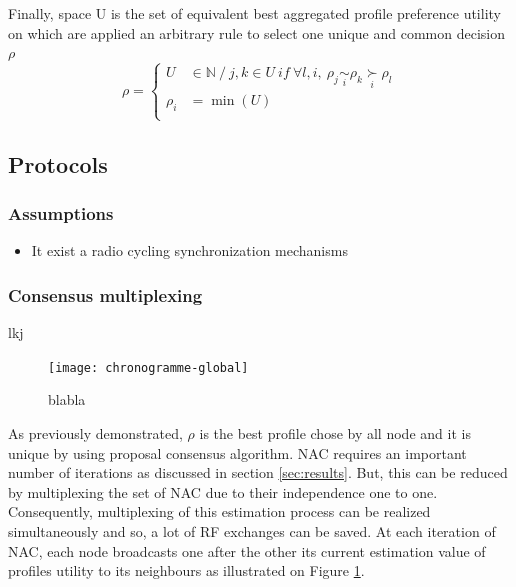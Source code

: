 \documentclass[conference]{IEEEtran}
\newcommand{\preferal}[1]{\underset{#1}{\succ}}
\newcommand{\equivalent}[1]{\underset{#1}{\sim}}
\begin{document}
Finally, space U is the set of equivalent best aggregated profile preference utility on which are applied an arbitrary rule to select one unique and common decision $\rho$
\begin{equation}
\label{eq-decision}
\rho = \left\{
      \begin{aligned}
      U &\in \mathbb{N} \ / \ j,k \in U \ if \ \forall l,i, \ \rho_j \equivalent{i} \rho_k \preferal{i} \rho_l \\
     \rho_i &= \min(U)\\
      \end{aligned}
    \right.
\end{equation}

\subsection{Protocols}

\subsubsection{Assumptions}


\begin{itemize}
   \item It exist a radio cycling synchronization mechanisms
\end{itemize}

\subsubsection{Consensus multiplexing} 
lkj

\begin{figure}[h!]
   \centering
   \texttt{[image: chronogramme-global]}\\
   \caption{\label{fig:chronogramme} blabla }
\end{figure}

As previously demonstrated, $\rho$ is the best profile chose by all node and it is unique by using proposal consensus algorithm. \gls{NAC} requires an important number of iterations as discussed in section \ref{sec:results}. But, this can be reduced by multiplexing the set of \gls{NAC} due to their independence one to one. Consequently, multiplexing of this estimation process can be realized simultaneously and so, a lot of RF exchanges can be saved. At each iteration of \gls{NAC}, each node broadcasts one after the other its current estimation value of profiles utility to its neighbours as illustrated on Figure \ref{fig:chronogramme}.
\end{document}
